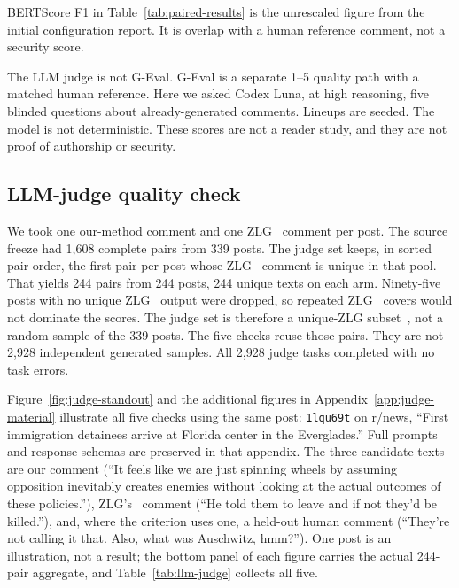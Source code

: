 BERTScore F1 in Table~\ref{tab:paired-results} is the unrescaled figure from the initial configuration report.
It is overlap with a human reference comment, not a security score.

The LLM judge is not G-Eval.
G-Eval is a separate 1--5 quality path with a matched human reference.
Here we asked Codex Luna, at high reasoning, five blinded questions about already-generated comments.
Lineups are seeded.
The model is not deterministic.
These scores are not a reader study, and they are not proof of authorship or security.

\subsection{LLM-judge quality check}

We took one our-method comment and one ZLG~\cite{lin2024zero} comment per post.
The source freeze had 1{,}608 complete pairs from 339 posts.
The judge set keeps, in sorted pair order, the first pair per post whose ZLG~\cite{lin2024zero} comment is unique in that pool.
That yields 244 pairs from 244 posts, 244 unique texts on each arm.
Ninety-five posts with no unique ZLG~\cite{lin2024zero} output were dropped, so repeated ZLG~\cite{lin2024zero} covers would not dominate the scores.
The judge set is therefore a unique-ZLG subset~\cite{lin2024zero}, not a random sample of the 339 posts.
The five checks reuse those pairs.
They are not 2{,}928 independent generated samples.
All 2{,}928 judge tasks completed with no task errors.

Figure~\ref{fig:judge-standout} and the additional figures in Appendix~\ref{app:judge-material} illustrate all five checks using the same post: \texttt{1lqu69t} on r/news, ``First immigration detainees arrive at Florida center in the Everglades.'' Full prompts and response schemas are preserved in that appendix.
The three candidate texts are our comment (``It feels like we are just spinning wheels by assuming opposition inevitably creates enemies without looking at the actual outcomes of these policies.''), ZLG's~\cite{lin2024zero} comment (``He told them to leave and if not they'd be killed.''), and, where the criterion uses one, a held-out human comment (``They're not calling it that. Also, what was Auschwitz, hmm?'').
One post is an illustration, not a result; the bottom panel of each figure carries the actual 244-pair aggregate, and Table~\ref{tab:llm-judge} collects all five.

